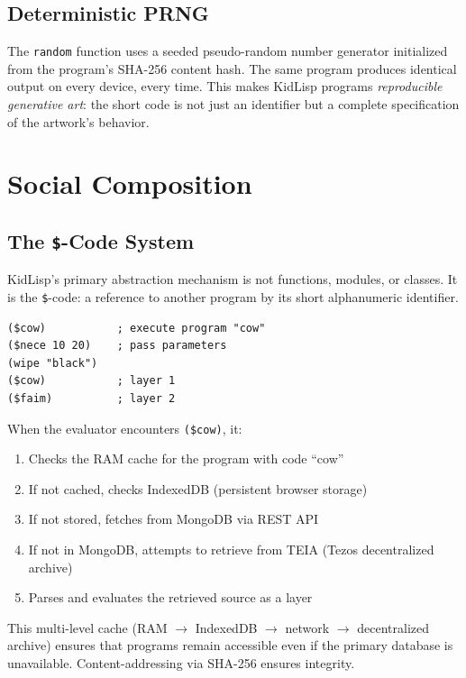 \documentclass[sigconf,nonacm]{acmart}
\begin{document}
\subsection{Deterministic PRNG}

The \texttt{random} function uses a seeded pseudo-random number generator initialized from the program's SHA-256 content hash. The same program produces identical output on every device, every time. This makes KidLisp programs \emph{reproducible generative art}: the short code is not just an identifier but a complete specification of the artwork's behavior.

\section{Social Composition}
\label{sec:composition}

\subsection{The \texttt{\$}-Code System}

KidLisp's primary abstraction mechanism is not functions, modules, or classes. It is the \texttt{\$}-code: a reference to another program by its short alphanumeric identifier.

\begin{lstlisting}
($cow)           ; execute program "cow"
($nece 10 20)    ; pass parameters
(wipe "black")
($cow)           ; layer 1
($faim)          ; layer 2
\end{lstlisting}

When the evaluator encounters \texttt{(\$cow)}, it:
\begin{enumerate}
  \item Checks the RAM cache for the program with code ``cow''
  \item If not cached, checks IndexedDB (persistent browser storage)
  \item If not stored, fetches from MongoDB via REST API
  \item If not in MongoDB, attempts to retrieve from TEIA (Tezos decentralized archive)
  \item Parses and evaluates the retrieved source as a layer
\end{enumerate}

This multi-level cache (RAM $\rightarrow$ IndexedDB $\rightarrow$ network $\rightarrow$ decentralized archive) ensures that programs remain accessible even if the primary database is unavailable. Content-addressing via SHA-256 ensures integrity.
\end{document}
